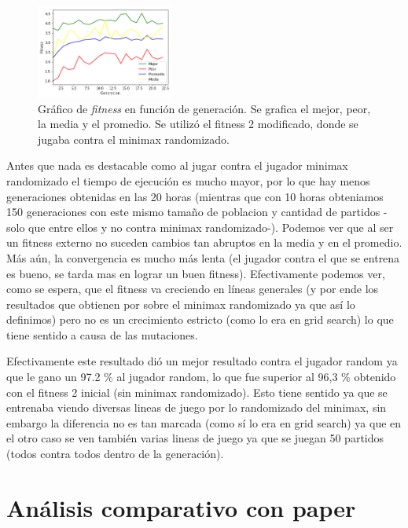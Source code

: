 \documentclass[A4paper,oneside,fleqn,11pt]{article}
\theoremstyle{definition}
\begin{document}
\begin{figure}
	\includegraphics[width=0.4\textwidth]{GenBack.png}
	\caption{ Gráfico de \textit{fitness} en función de generación. Se grafica el mejor, peor, la media y el promedio. Se utilizó el fitness 2 modificado, donde se jugaba contra el minimax randomizado.}
\end{figure}

Antes que nada es destacable como al jugar contra el jugador minimax randomizado el tiempo de ejecución es mucho mayor, por lo que hay menos generaciones obtenidas en las 20 horas (mientras que con 10 horas obteniamos 150 generaciones con este mismo tamaño de poblacion y cantidad de partidos -solo que entre ellos y no contra minimax randomizado-). Podemos ver que al ser un fitness externo no suceden cambios tan abruptos en la media y en el promedio. Más aún, la convergencia es mucho más lenta (el jugador contra el que se entrena es bueno, se tarda mas en lograr un buen fitness). Efectivamente  podemos ver, como se espera, que el fitness va creciendo en líneas generales (y por ende los resultados que obtienen por sobre el minimax randomizado ya que así lo definimos) pero no es un crecimiento estricto (como lo era en grid search) lo que tiene sentido a causa de las mutaciones.

Efectivamente este resultado dió un mejor resultado contra el jugador random ya que le gano un 97.2 \% al jugador random, lo que fue superior al 96,3 \% obtenido con el fitness 2 inicial (sin minimax randomizado). Esto tiene sentido ya que se entrenaba viendo diversas lineas de juego por lo randomizado del minimax, sin embargo la diferencia no es tan marcada (como sí lo era en grid search) ya que en el otro caso se ven también varias lineas de juego ya que se juegan 50 partidos (todos contra todos dentro de la generación).



\section{Análisis comparativo con paper}
\end{document}
